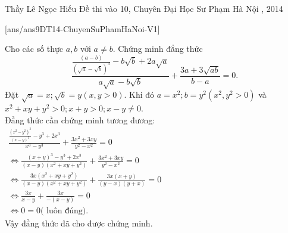 \begin{name}
{Thầy  Lê Ngọc Hiếu}
{Đề thi vào 10, Chuyên Đại Học Sư Phạm Hà Nội , 2014}
\end{name}
\setcounter{ex}{0}
[ans/ans9DT14-ChuyenSuPhamHaNoi-V1]
\begin{ex}%
 
    Cho các số thực $a,b$ với $a \neq b$. Chứng minh đẳng thức \\
    \[\displaystyle \frac{{\displaystyle \frac{{\left( {a - b} \right)}}{{{{\left( {\sqrt a  - \sqrt b } \right)}^3}}} - b\sqrt b  + 2a\sqrt a }}{{a\sqrt a  - b\sqrt b }} + \frac{{3a + 3\sqrt {ab} }}{{b - a}} = 0.\]
\loigiai
    {Đặt $\sqrt{a}=x;\sqrt{b}=y(x,y>0)$. Khi đó $a=x^2;b=y^2(x^2,y^2>0)$ và $x^2+xy+y^2>0;x+y>0;x-y \neq 0$.\\
    Đẳng thức cần chứng minh tương đương:\\
     $\displaystyle \begin{array}{l}
\displaystyle \frac{{\frac{{{{\left( {{x^2} - {y^2}} \right)}^3}}}{{{{\left( {x - y} \right)}^3}}} - {y^3} + 2{x^3}}}{{{x^3} - {y^3}}} + \displaystyle \frac{{3{x^2} + 3xy}}{{{y^2} - {x^2}}} = 0\\
\displaystyle  \Leftrightarrow \frac{{{{\left( {x + y} \right)}^3} - {y^3} + 2{x^3}}}{{\left( {x - y} \right)\left( {{x^2} + xy + {y^2}} \right)}} + \frac{{3{x^2} + 3xy}}{{{y^2} - {x^2}}} = 0\\
 \displaystyle \Leftrightarrow \frac{{3x\left( {{x^2} + xy + {y^2}} \right)}}{{\left( {x - y} \right)\left( {{x^2} + xy + {y^2}} \right)}} + \frac{{3x\left( {x + y} \right)}}{{\left( {y - x} \right)\left( {y + x} \right)}} = 0\\
 \displaystyle \Leftrightarrow \frac{{3x}}{{x - y}} + \frac{{3x}}{{ - \left( {x - y} \right)}} = 0\\
 \displaystyle \Leftrightarrow 0 = 0 \text{( luôn đúng).}
\end{array}$\\
Vậy đẳng thức đã cho được chứng minh.    
    }
\end{ex}

